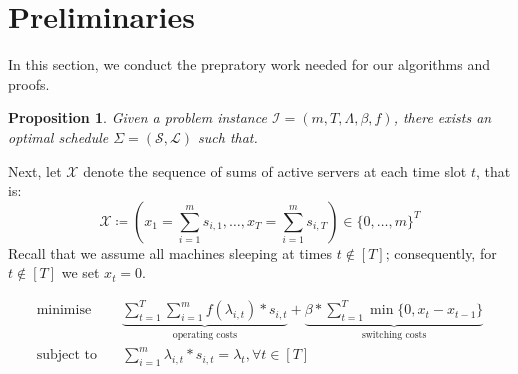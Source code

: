 \documentclass[hidelinks]{article}
\makeatletter
\renewenvironment{proof}[1][\proofname]{\par
  \vspace{-\parskip}%
  \pushQED{\qed}%
  \normalfont
  \topsep0pt \partopsep0pt %
  \trivlist
  \item[\hskip\labelsep
        \itshape
    #1\@addpunct{.}]\ignorespaces
}{%
  \popQED\endtrivlist\@endpefalse
  \addvspace{6pt plus 6pt} %
}
\theoremstyle{plain}
\newtheorem{prop}[thm]{Proposition}
\theoremstyle{definition}
\newtheorem{defn}[thm]{Definition}
\theoremstyle{rem}
\newcommand{\mx}{\mathcal{X}}
\newcommand{\inp}{\mathcal{I}}
\newcommand{\sched}{\Sigma=(\mathcal{S},\mathcal{L})}
\newcommand{\fromto}[2]{\{#1,\ldots,#2\}}
\makeatother
\begin{document}
\section{Preliminaries}
In this section, we conduct the prepratory work needed for our algorithms and proofs.
\begin{prop}
Given a problem instance $\inp=(m,T,\Lambda,\beta,f)$, there exists an optimal schedule $\sched$ such that.
\end{prop}
\begin{proof}
\end{proof}
 Next, let $\mx$ denote the sequence of sums of active servers at each time slot $t$, that is:
\begin{equation*}
	\mx\coloneqq(x_1=\sum\limits_{i=1}^{m}s_{i,1},\ldots,x_T=\sum\limits_{i=1}^{m}s_{i,T})\in\fromto{0}{m}^T
\end{equation*}
Recall that we assume all machines sleeping at times $t\notin[T]$; consequently, for $t\notin[T]$ we set $x_t=0$.



\begin{align*}
	\text{minimise}\quad&\underbrace{\sum\limits_{t=1}^{T}\sum\limits_{i=1}^{m}f(\lambda_{i,t})*s_{i,t}}_{\text{operating costs}}+\underbrace{\beta*\sum\limits_{t=1}^{T}\min\{0,x_t-x_{t-1}\}}_{\text{switching costs}}
\\ 
	\text{subject to}\quad&\sum\limits_{i=1}^{m}\lambda_{i,t}*s_{i,t}=\lambda_t,\forall t\in[T]
\end{align*}
\end{document}
